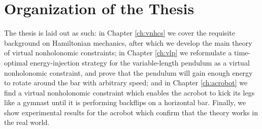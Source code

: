 \section{Organization of the Thesis}
The thesis is laid out as such: 
in Chapter \ref{ch:vnhcs} we cover the requisite background on Hamiltonian
mechanics, after which we develop the main theory of virtual nonholonomic
constraints;
in Chapter \ref{ch:vlp} we reformulate a time-optimal energy-injection strategy
for the variable-length pendulum as a virtual nonholonomic constraint, and
prove that the pendulum will gain enough energy to rotate around the bar with
arbitrary speed;
and in Chapter \ref{ch:acrobot} we find a virtual nonholonomic constraint 
which enables the acrobot to kick its legs like a gymnast until it is
performing backflips on a horizontal bar.
Finally, we show experimental results for the acrobot which confirm that the
theory works in the real world.

